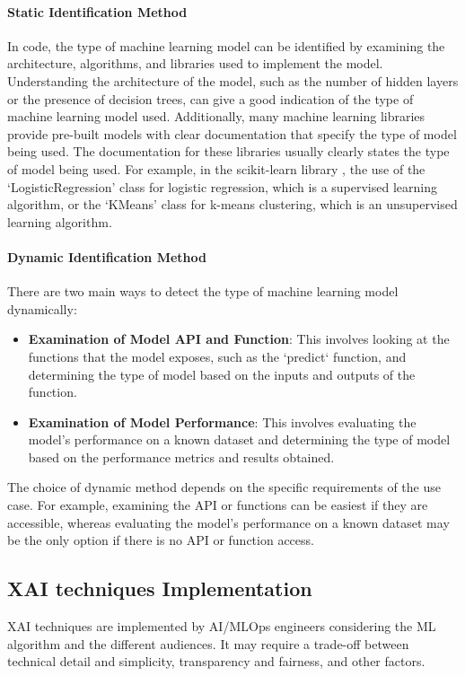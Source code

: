 \documentclass[conference]{IEEEtran}
\begin{document}
\paragraph{Static Identification Method} In code, the type of machine learning model can be identified by examining the architecture, algorithms, and libraries used to implement the model. Understanding the architecture of the model, such as the number of hidden layers or the presence of decision trees, can give a good indication of the type of machine learning model used. Additionally, many machine learning libraries provide pre-built models with clear documentation that specify the type of model being used. The documentation for these libraries usually clearly states the type of model being used. 
For example, in the scikit-learn library \cite{pedregosa2011scikit}, the use of the `LogisticRegression' class for logistic regression, which is a supervised learning algorithm, or the `KMeans' class for k-means clustering, which is an unsupervised learning algorithm.
\paragraph{Dynamic Identification Method}There are two main ways to detect the type of machine learning model dynamically:

\begin{itemize}
	\item \textbf{Examination of Model API and Function}: This involves looking at the functions that the model exposes, such as the `predict` function, and determining the type of model based on the inputs and outputs of the function.

	\item \textbf{Examination of Model Performance}: This involves evaluating the model's performance on a known dataset and determining the type of model based on the performance metrics and results obtained.
\end{itemize}

The choice of dynamic method depends on the specific requirements of the use case. For example, examining the API or functions can be easiest if they are accessible, whereas evaluating the model's performance on a known dataset may be the only option if there is no API or function access.

\subsection{XAI techniques Implementation}
XAI techniques are implemented by AI/MLOps engineers considering the ML algorithm and the different audiences. It may require a trade-off between technical detail and simplicity, transparency and fairness, and other factors.
\end{document}
